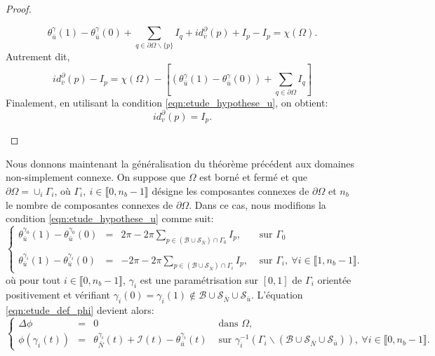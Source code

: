\begin{proof}
\begin{itemize}
        $$
        \theta_{\bar{u}}^\gamma(1)-\theta_{\bar{u}}^\gamma(0)+\sum_{q\in\partial\Omega\backslash\{p\}}I_q + id^\partial_{\bar{v}}(p) + I_p - I_p =\chi(\Omega).
        $$
        Autrement dit,
        $$
        id^\partial_{\bar{v}}(p) - I_p =\chi(\Omega)-\left[\left(\theta_{\bar{u}}^\gamma(1)-\theta_{\bar{u}}^\gamma(0)\right)+\sum_{q\in\partial\Omega} I_q\right]
        $$
        Finalement, en utilisant la condition \eqref{eqn:etude_hypothese_u}, on obtient:
        $$
        id^\partial_v(p)=I_p.
        $$
    \end{itemize}
\end{proof}

Nous donnons maintenant la généralisation du théorème précédent aux domaines non-simplement connexe. On suppose que $\Omega$ est borné et fermé et que $\partial\Omega=\cup_i\Gamma_i$, où $\Gamma_i,~i\in\llbracket 0, n_b-1\rrbracket$ désigne les composantes connexes de $\partial\Omega$ et $n_b$ le nombre de composantes connexes de $\partial\Omega$. Dans ce cas, nous modifions la condition \eqref{eqn:etude_hypothese_u} comme suit:
\begin{equation}
    \left\{
    \begin{array}{lcll}
    \theta_{\bar{u}}^{\gamma_0}(1)-\theta_{\bar{u}}^{\gamma_0}(0)&=&2\pi-2\pi\displaystyle\sum_{p\in(\mathcal{B}\cup\mathcal{S}_{\bar{N}})\cap\Gamma_0}I_p,&\mbox{ sur }\Gamma_0\\\\
    \theta_{\bar{u}}^{\gamma_i}(1)-\theta_{\bar{u}}^{\gamma_i}(0)&=&-2\pi-2\pi\displaystyle\sum_{p\in(\mathcal{B}\cup\mathcal{S}_{\bar{N}})\cap\Gamma_i}I_p,&\mbox{ sur }\Gamma_i,~\forall i\in\llbracket 1, n_b-1\rrbracket.
    \end{array}
    \right.
    \label{eqn:etude_hypothese_u_second}
\end{equation}
où pour tout $i\in\llbracket0, n_b-1\rrbracket$, $\gamma_i$ est une paramétrisation sur $[0, 1]$ de $\Gamma_i$ orientée positivement et vérifiant $\gamma_i(0)=\gamma_i(1)\notin\mathcal{B}\cup\mathcal{S}_{\bar{N}}\cup\mathcal{S}_{\bar{u}}$. L'équation \eqref{eqn:etude_def_phi} devient alors:
\begin{equation}
\left\{
\begin{array}{lcll}
\Delta\phi &=& 0 &\mbox{ dans }\Omega,\\[0.5cm]
\phi(\gamma_i(t))&=&\theta_{\bar{N}}^{\gamma_i}(t)+\mathcal{I}(t)-\theta_{\bar{u}}^{\gamma_i}(t) & \mbox{ sur } \gamma_i^{-1}(\Gamma_i\backslash(\mathcal{B}\cup\mathcal{S}_{\bar{N}}\cup\mathcal{S}_{\bar{u}})),~\forall i\in\llbracket 0, n_b-1\rrbracket.
\end{array}
\right.
\label{eqn:etude_def_phi_second}
\end{equation}
